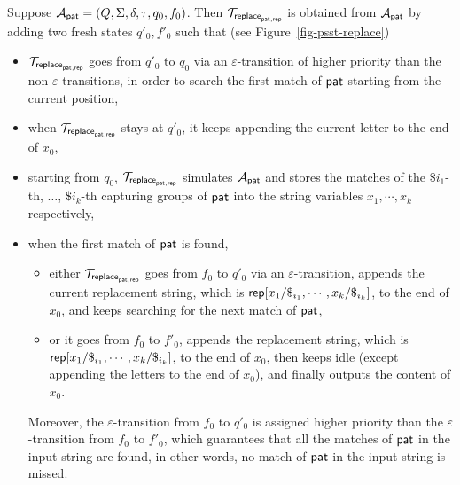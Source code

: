 Suppose $\mathcal{A}_{\mathsf{pat}} = (Q, \Sigma, \delta, \tau, q_0, f_0)$. Then $\mathcal{T}_{\mathsf{replace}_{\mathsf{pat},\mathsf{rep}}}$ is obtained from $\mathcal{A}_{\mathsf{pat}}$ by adding two fresh states $q'_0, f'_0$ such that (see Figure~\ref{fig-psst-replace})
\begin{itemize}
\item $\mathcal{T}_{\mathsf{replace}_{\mathsf{pat},\mathsf{rep}}}$ goes from $q'_0$ to $q_0$ via an $\varepsilon$-transition of higher priority than the non-$\varepsilon$-transitions, in order to search the first match of $\mathsf{pat}$ starting from the current position, 
%
\item when $\mathcal{T}_{\mathsf{replace}_{\mathsf{pat},\mathsf{rep}}}$ stays at $q'_0$, it keeps appending the current letter to the end of $x_0$, 
%
\item starting from $q_0$, $\mathcal{T}_{\mathsf{replace}_{\mathsf{pat},\mathsf{rep}}}$ simulates $\mathcal{A}_{\mathsf{pat}}$ and stores the matches of the $\$i_1$-th, $\ldots$, $\$i_k$-th capturing groups of $\mathsf{pat}$ into the string variables $x_1, \cdots, x_k$ respectively,   
%
\item when the first match of $\mathsf{pat}$ is found, 
\begin{itemize}
\item either $\mathcal{T}_{\mathsf{replace}_{\mathsf{pat},\mathsf{rep}}}$ goes from $f_0$ to $q'_0$ via an $\varepsilon$-transition, appends the current replacement string, which is $\mathsf{rep}[x_1/\$_{i_1}, \cdots, x_k/\$_{i_k}]$, to the end of $x_0$, and keeps searching for the next match of $\mathsf{pat}$, 
%
\item or it goes from $f_0$ to $f'_0$, appends the replacement string, which is $\mathsf{rep}[x_1/\$_{i_1}, \cdots, x_k/\$_{i_k}]$, to the end of $x_0$, then keeps idle (except appending the letters to the end of $x_0$), and finally outputs the content of $x_0$.
\end{itemize}
Moreover, the $\varepsilon$-transition from $f_0$ to $q'_0$ is assigned higher priority than the $\varepsilon$-transition from $f_0$ to $f'_0$, which guarantees that all the matches of $\mathsf{pat}$ in the input string are found, in other words, no match of $\mathsf{pat}$ in the input string is missed.
\end{itemize}

